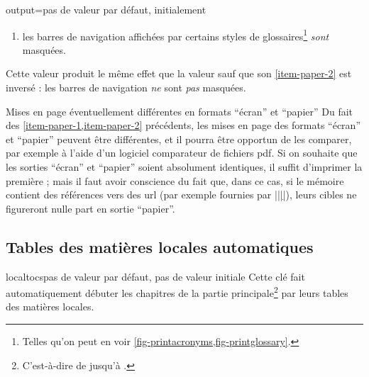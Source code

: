\begin{docKey}{output}{=\textbar{}\textbar{}}{pas
    de valeur par défaut, initialement }
\begin{description}
\begin{enumerate}
    \item%
      \label{item-paper-2}%
      les barres de navigation affichées par certains styles de
      glossaires\footnote{Telles qu'on peut en voir
        \vref{fig-printacronyms,fig-printglossary}.} \emph{sont} masquées.
    \end{enumerate}
  \item[\docValue{paper*}.]%
    Cette valeur produit le même effet que la valeur  sauf que
    son \vref{item-paper-2} est inversé : les barres de navigation \emph{ne}
    sont \emph{pas} masquées.
  \end{description}
\end{docKey}

\begin{dbwarning}{Mises en page éventuellement différentes en formats
    \enquote{écran} et \enquote{papier}}{}
  Du fait des \cref{item-paper-1,item-paper-2} précédents, les mises en page des
  formats \enquote{écran} et \enquote{papier} peuvent être différentes, et il
  pourra être opportun de les comparer, par exemple à l'aide d'un logiciel
  comparateur de fichiers \acrshort{pdf}. Si on souhaite que les sorties
  \enquote{écran} et \enquote{papier} soient absolument identiques, il suffit
  d'imprimer la première ; mais il faut avoir conscience du fait que, dans ce
  cas, si le mémoire contient des références vers des \acrshort{url} (par
  exemple fournies par |\href{|\meta{\acrshort*{url}}|}{||}|), leurs
  cibles ne figureront nulle part en sortie \enquote{papier}.
\end{dbwarning}

\subsection{Tables des matières locales automatiques}
\label{sec-localtoc}%
%

%
%

\begin{docKey}[][doc new=2016-10-16]{localtocs}{}{pas de valeur par défaut, pas
    de valeur initiale} 
  Cette clé fait automatiquement débuter les chapitres de la partie
  principale\footnote{C'est-à-dire de  jusqu'à
    .} par leurs tables des matières locales.
\end{docKey}

